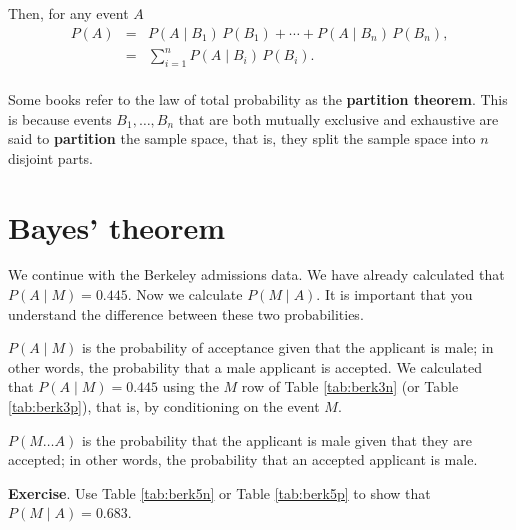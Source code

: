 \documentclass[
  11pt,
  british,
  openany, a4paper]{book}
\begin{document}
Then, for any event \(A\)
\begin{eqnarray}
P(A) &=& P(A \mid B_1)\,P(B_1) + \cdots + P(A \mid B_n)\,P(B_n), \\
     &=& \displaystyle\sum_{i=1}^n P(A \mid B_i)\,P(B_i). \\
\end{eqnarray}

Some books refer to the law of total probability as the \textbf{partition theorem}. This is because events \(B_1, \ldots, B_n\) that are both mutually exclusive and exhaustive are said to \textbf{partition} the sample space, that is, they split the sample space into \(n\) disjoint parts.

\hypertarget{bayes-theorem}{%
\section{Bayes' theorem}\label{bayes-theorem}}

We continue with the Berkeley admissions data. We have already calculated that \(P(A \mid M) = 0.445\). Now we calculate \(P(M \mid A)\). It is important that you understand the difference between these two probabilities.

\(P(A \mid M)\) is the probability of acceptance given that the applicant is male; in other words, the probability that a male applicant is accepted. We calculated that \(P(A \mid M)=0.445\) using the \(M\) row of Table \ref{tab:berk3n} (or Table \ref{tab:berk3p}), that is, by conditioning on the event \(M\).

\(P(M \ldots A)\) is the probability that the applicant is male given that they are accepted; in other words, the probability that an accepted applicant is male.

\textbf{Exercise}. Use Table \ref{tab:berk5n} or Table \ref{tab:berk5p} to show that \(P(M \mid A) = 0.683\).

 
  \providecommand{\huxb}[2]{\arrayrulecolor[RGB]{#1}\global\arrayrulewidth=#2pt}
  \providecommand{\huxvb}[2]{\color[RGB]{#1}\vrule width #2pt}
  \providecommand{\huxtpad}[1]{\rule{0pt}{#1}}
  \providecommand{\huxbpad}[1]{\rule[-#1]{0pt}{#1}}
\end{document}
